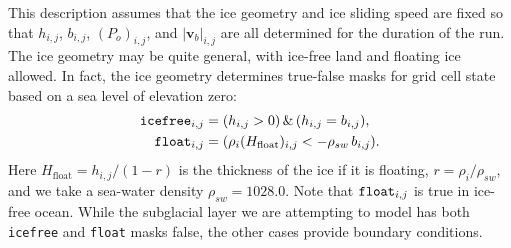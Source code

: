 \documentclass[11pt,final]{amsart}%
\newcommand\bv{\mathbf{v}}
\begin{document}
This description assumes that the ice geometry and ice sliding speed are fixed so that $h_{i,j}$, $b_{i,j}$, $(P_o)_{i,j}$, and $|\bv_b|_{i,j}$ are all determined for the duration of the run.  The ice geometry may be quite general, with ice-free land and floating ice allowed.  In fact, the ice geometry determines true-false masks for grid cell state based on a sea level of elevation zero:
\begin{align*}
\text{\texttt{icefree}}_{i,j} &= (h_{i,j} > 0)\, \&\, (h_{i,j} = b_{i,j}), \\
\text{\texttt{float}}_{i,j}   &= (\rho_i (H_{\text{float}})_{i,j} < - \rho_{sw}\, b_{i,j}).
\end{align*}
Here $H_{\text{float}}=h_{i,j} / (1 - r)$ is the thickness of the ice if it is floating, $r=\rho_i / \rho_{sw}$, and we take a sea-water density $\rho_{sw}=1028.0$.  Note that $\text{\texttt{float}}_{i,j}$ is true in ice-free ocean.  While the subglacial layer we are attempting to model has both \texttt{icefree} and \texttt{float} masks false, the other cases provide boundary conditions.
\end{document}
